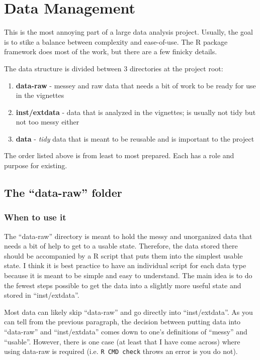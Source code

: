 \documentclass[]{book}
\providecommand{\tightlist}{%
  \setlength{\itemsep}{0pt}\setlength{\parskip}{0pt}}
\begin{document}
\hypertarget{data-management}{%
\chapter{Data Management}\label{data-management}}

This is the most annoying part of a large data analysis project. Usually, the goal is to stike a balance between complexity and ease-of-use. The R package framework does most of the work, but there are a few finicky details.

The data structure is divided between 3 directories at the project root:

\begin{enumerate}
\def\labelenumi{\arabic{enumi}.}
\tightlist
\item
  \textbf{data-raw} - messey and raw data that needs a bit of work to be ready for use in the vignettes
\item
  \textbf{inst/extdata} - data that is analyzed in the vignettes; is usually not tidy but not too messy either
\item
  \textbf{data} - \emph{tidy} data that is meant to be reusable and is important to the project
\end{enumerate}

The order listed above is from least to most prepared. Each has a role and purpose for existing.

\hypertarget{the-data-raw-folder}{%
\section{The ``data-raw'' folder}\label{the-data-raw-folder}}

\hypertarget{when-to-use-it}{%
\subsection{When to use it}\label{when-to-use-it}}

The ``data-raw'' directory is meant to hold the messy and unorganized data that needs a bit of help to get to a usable state. Therefore, the data stored there should be accompanied by a R script that puts them into the simplest usable state. I think it is best practice to have an individual script for each data type because it is meant to be simple and easy to understand. The main idea is to do the fewest steps possible to get the data into a slightly more useful state and stored in ``inst/extdata''.

Most data can likely skip ``data-raw'' and go directly into ``inst/extdata''. As you can tell from the previous paragraph, the decision between putting data into ``data-raw'' and ``inst/extdata'' comes down to one's definitions of ``messy'' and ``usable''. However, there is one case (at least that I have come across) where using data-raw is required (i.e. \texttt{R\ CMD\ check} throws an error is you do not).
\end{document}
